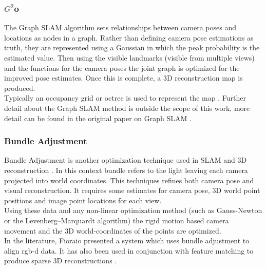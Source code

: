 
\subsubsection{$G^2$o}
\label{Sec:G20}
The Graph SLAM algorithm sets relationships between camera poses and locations as nodes in a graph. Rather than defining camera pose estimations as truth, they are represented using a Gaussian in which the peak probability is the estimated value. Then using the visible landmarks (visible from multiple views) and the functions for the camera poses the joint graph is optimized for the improved pose estimates. Once this is complete, a 3D reconstruction map is produced. \\

Typically an occupancy grid or octree is used to represent the map \cite{Wurm10Octomap}. Further detail about the Graph SLAM method is outside the scope of this work, more detail can be found in the original paper on Graph SLAM \cite{Kummerle11G}. \\

\subsubsection{Bundle Adjustment}
\label{sec:ba}
Bundle Adjustment is another optimization technique used in SLAM and 3D reconstruction \cite{Lourakis09Sba}. In this context bundle refers to the light leaving each camera projected into world coordinates. This techniques refines both camera pose and visual reconstruction. It requires some estimates for camera pose, 3D world point positions and image point locations for each view. \\

Using these data and any non-linear optimization method (such as Gauss-Newton or the Levenberg–Marquardt algorithm) the rigid motion based camera movement and the 3D world-coordinates of the points are optimized. \\

In the literature, Fioraio \cite{Fioraio11Realtime} presented a system which uses bundle adjustment to align rgb-d data. It has also been used in conjunction with feature matching to produce sparse 3D reconstructions \cite{Klein07Parallel,Agarwal09Building}.
